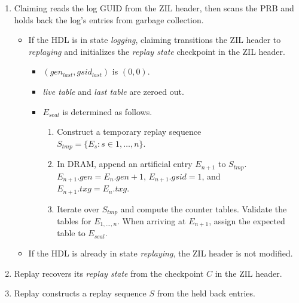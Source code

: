 \documentclass[12pt,a4paper,twoside]{book}
\begin{document}
\begin{enumerate}[noitemsep,beginpenalty=100000,midpenalty=100000]
    \item \label{ccReplay:claimscan} Claiming reads the log GUID from the ZIL header, then scans the PRB and holds back the log's entries from garbage collection.
    \begin{itemize}[noitemsep,beginpenalty=100000,midpenalty=100000]
        \item \label{ccReplay:transitionToReplaying} If the HDL is in state \textit{logging}, claiming transitions the ZIL header to \textit{replaying} and initializes the \textit{replay state} checkpoint in the ZIL header.
            \begin{itemize}
                \item $(gen_{last}, gsid_{last})$ is $(0, 0)$.
                \item \textit{live table} and \textit{last table} are zeroed out.
                \item $E_{seal}$ is determined as follows.
                \begin{enumerate}
                    \item Construct a temporary replay sequence \\ \mbox{$S_{tmp} = \{E_s : s \in 1, \dots, n\}$}.
                    \item In DRAM, append an artificial entry $E_{n+1}$ to $S_{tmp}$. \\
                        \mbox{$E_{n+1}.gen = E_{n}.gen + 1$}, \mbox{$E_{n+1}.gsid = 1$}, and \\
                        \mbox{$E_{n+1}.txg = E_{n}.txg$}.
                    \item Iterate over $S_{tmp}$ and compute the counter tables.
                        Validate the tables for $E_{1,\dots,n}$.
                        When arriving at $E_{n+1}$, assign the expected table to $E_{seal}$.
                \end{enumerate}
            \end{itemize}
        \item If the HDL is already in state \textit{replaying}, the ZIL header is not modified.
    \end{itemize}
    \item Replay recovers its \textit{replay state} from the checkpoint $C$ in the ZIL header.
    \item \label{ccReplay:construct_sequence} Replay constructs a replay sequence $S$ from the held back entries.

\end{enumerate}
\end{document}
